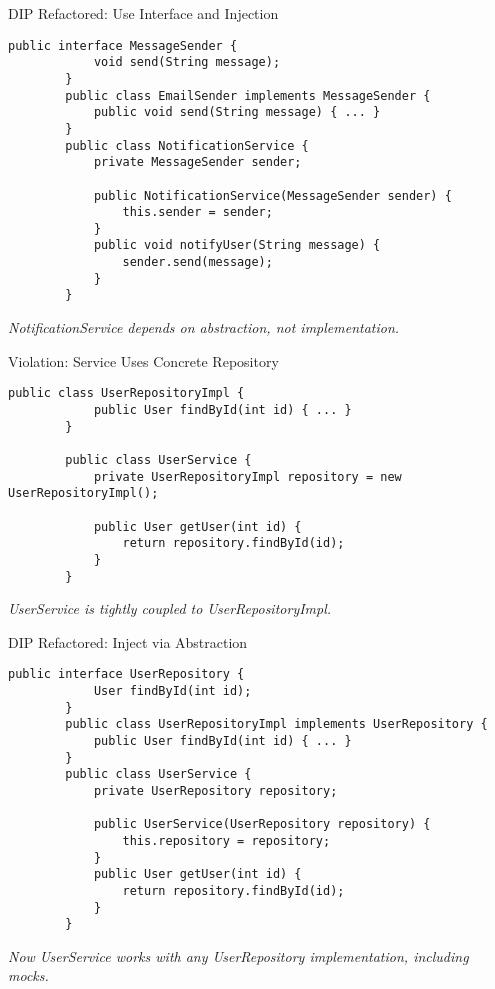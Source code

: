 \documentclass[aspectratio=169, table]{beamer}
\begin{document}
\begin{frame}[fragile]{DIP Refactored: Use Interface and Injection}
	\vspace{20pt}
	\begin{lstlisting}[style=JavaStyle]
		public interface MessageSender {
			void send(String message);
		}
		public class EmailSender implements MessageSender {
			public void send(String message) { ... }
		}
		public class NotificationService {
			private MessageSender sender;
			
			public NotificationService(MessageSender sender) {
				this.sender = sender;
			}
			public void notifyUser(String message) {
				sender.send(message);
			}
		}
	\end{lstlisting}
	
	\textit{NotificationService depends on abstraction, not implementation.}
\end{frame}

\begin{frame}[fragile]{Violation: Service Uses Concrete Repository}
	\vspace{20pt}
	\begin{lstlisting}[style=JavaStyle]
		public class UserRepositoryImpl {
			public User findById(int id) { ... }
		}
		
		public class UserService {
			private UserRepositoryImpl repository = new UserRepositoryImpl();
			
			public User getUser(int id) {
				return repository.findById(id);
			}
		}
	\end{lstlisting}
	
	\textit{UserService is tightly coupled to UserRepositoryImpl.}
\end{frame}

\begin{frame}[fragile]{DIP Refactored: Inject via Abstraction}
	\vspace{20pt}
	\begin{lstlisting}[style=JavaStyle]
		public interface UserRepository {
			User findById(int id);
		}
		public class UserRepositoryImpl implements UserRepository {
			public User findById(int id) { ... }
		}
		public class UserService {
			private UserRepository repository;
			
			public UserService(UserRepository repository) {
				this.repository = repository;
			}
			public User getUser(int id) {
				return repository.findById(id);
			}
		}
	\end{lstlisting}
	
	\textit{Now UserService works with any UserRepository implementation, including mocks.}
\end{frame}
\end{document}
